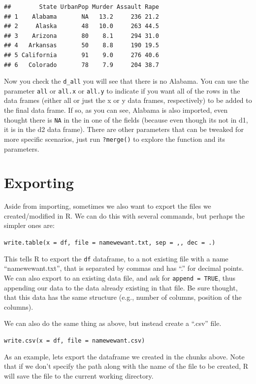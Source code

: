 \documentclass[
]{book}
\begin{document}
\begin{verbatim}
##        State UrbanPop Murder Assault Rape
## 1    Alabama       NA   13.2     236 21.2
## 2     Alaska       48   10.0     263 44.5
## 3    Arizona       80    8.1     294 31.0
## 4   Arkansas       50    8.8     190 19.5
## 5 California       91    9.0     276 40.6
## 6   Colorado       78    7.9     204 38.7
\end{verbatim}

Now you check the \texttt{d\_all} you will see that there is no Alabama.
You can use the parameter \texttt{all} or \texttt{all.x} or \texttt{all.y} to indicate if you want all of the rows in the data frames (either all or just the x or y data frames, respectively) to be added to the final data frame.
If so, as you can see, Alabama is also imported, even thought there is \texttt{NA} in the in one of the fields (because even though its not in d1, it is in the d2 data frame).
There are other parameters that can be tweaked for more specific scenarios, just run \texttt{?merge()} to explore the function and its parameters.

\hypertarget{exporting}{%
\section{Exporting}\label{exporting}}

Aside from importing, sometimes we also want to export the files we created/modified in R.
We can do this with several commands, but perhaps the simpler ones are:

\texttt{write.table(x\ =\ df,\ file\ =\ \textquotesingle{}namewewant.txt\textquotesingle{},\ sep\ =\ \textquotesingle{},\textquotesingle{},\ dec\ =\ \textquotesingle{}.\textquotesingle{})}

This tells R to export the \texttt{df} dataframe, to a not existing file with a name ``namewewant.txt'', that is separated by commas and has ``.'' for decimal points.
We can also export to an existing data file, and ask for \texttt{append\ =\ TRUE}, thus appending our data to the data already existing in that file.
Be sure thought, that this data has the same structure (e.g., number of columns, position of the columns).

We can also do the same thing as above, but instead create a ``.csv'' file.

\texttt{write.csv(x\ =\ df,\ file\ =\ \textquotesingle{}namewewant.csv\textquotesingle{})}

As an example, lets export the dataframe we created in the chunks above.
Note that if we don't specify the path along with the name of the file to be created, R will save the file to the current working directory.
\end{document}
